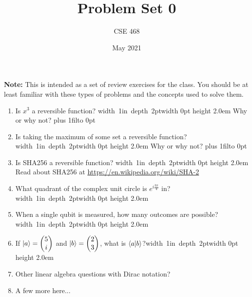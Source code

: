 \documentclass[12pt]{article}
\title{Problem Set 0}
\author{CSE 468}
\date{May 2021}
\newcommand{\Blank}{\mbox{\vrule width 1in depth 2pt}\vrule width 0pt height 2.0em}
\def\DefaultSpace{1in}
\newcommand{\LeaveSpace}[1][\DefaultSpace]{%
\vskip #1 plus 1fil\relax\hbox to 0pt{\hss} %
}
\begin{document}
\maketitle

\noindent \textbf{Note:} This is intended as a set of review exercises for the class. You should be at least familiar with these types of problems and the concepts used to solve them.

\begin{enumerate}[font=\bfseries]
    \item Is $x^3$ a reversible function? \Blank{} Why or why not? \LeaveSpace[0.5in]
    \item Is taking the maximum of some set a reversible function? \Blank{} Why or why not?\LeaveSpace{}
    \item Is SHA256 a reversible function? \Blank{} Read about SHA256 at \href{https://en.wikipedia.org/wiki/SHA-2}{https://en.wikipedia.org/wiki/SHA-2} 
    \item What quadrant of the complex unit circle is $e^{i\frac{3\pi}{4}}$ in?\Blank{}
    \item When a single qubit is measured, how many outcomes are possible?\Blank{}
    \item If $\ket{a} = \begin{pmatrix}5 \\ i \end{pmatrix}$ and $\ket{b} = \begin{pmatrix}2 \\ 3 \end{pmatrix}$, what is $\braket{a|b}$?\Blank{}
    \item Other linear algebra questions with Dirac notation?
    \item A few more here...
    
\end{enumerate}
\end{document}
